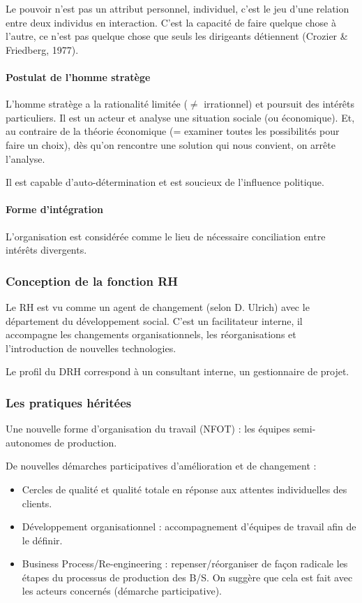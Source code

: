 \documentclass[12pt]{article}
\begin{document}
	Le pouvoir n'est pas un attribut personnel, individuel, c'est le jeu d'une relation entre deux individus en interaction. C'est la capacité de faire quelque chose à l'autre, ce n'est pas quelque chose que seuls les dirigeants détiennent (Crozier \& Friedberg, 1977).
	
	\paragraph{Postulat de l'homme stratège} L'homme stratège a la rationalité limitée ($\neq$ irrationnel) et poursuit des intérêts particuliers. Il est un acteur et analyse une situation sociale (ou économique). Et, au contraire de la théorie économique (= examiner toutes les possibilités pour faire un choix), dès qu'on rencontre une \og{} solution\fg{} qui nous convient, on arrête l'analyse.
	
	Il est capable d'auto-détermination et est soucieux de l'influence politique.
	
	\paragraph{Forme d'intégration} L'organisation est considérée comme le lieu de nécessaire conciliation entre intérêts divergents.
	
	\subsubsection{Conception de la fonction RH}

	Le RH est vu comme un \og{} agent de changement\fg{} (selon D. Ulrich) avec le département du développement social. C’est un facilitateur interne, il accompagne les changements organisationnels, les réorganisations et l’introduction de nouvelles technologies.
	
	Le profil du DRH correspond à un consultant interne, un gestionnaire de projet.
	
	\subsubsection{Les pratiques héritées}
	
	Une nouvelle forme d’organisation du travail (NFOT) : les équipes semi-autonomes de production.
	
	De nouvelles démarches participatives d’amélioration et de changement :
	
	\begin{itemize}
		\item Cercles de qualité et qualité totale en réponse aux attentes individuelles des clients.
		\item Développement organisationnel : accompagnement d’équipes de travail afin de le définir.
		\item \og{}Business Process/Re-engineering\fg{} : repenser/réorganiser de façon radicale les étapes du processus de production des B/S. On suggère que cela est fait avec les acteurs concernés (démarche participative).
	\end{itemize}
	
\end{document}
